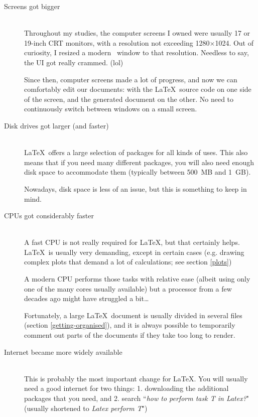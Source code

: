 \begin{description}
	\item[Screens got bigger] \mbox{} \\
	Throughout my studies, the computer screens I owned were usually 17 or 19-inch CRT monitors, with a resolution not exceeding 1280$\times$1024. Out of curiosity, I resized a modern \TeXstudio\ window to that resolution. Needless to say, the UI got really crammed. (lol)
	
	Since then, computer screens made a lot of progress, and now we can comfortably edit our documents: with the \LaTeX\ source code on one side of the screen, and the generated document on the other. No need to continuously switch between windows on a small screen.
	
	\item[Disk drives got larger (and faster)] \mbox{} \\
	\LaTeX\ offers a large selection of packages for all kinds of uses. This also means that if you need many different packages, you will also need enough disk space to accommodate them (typically between 500~MB and 1~GB).
	
	Nowadays, disk space is less of an issue, but this is something to keep in mind.
	
	\item[CPUs got considerably faster] \mbox{} \\
	A fast CPU is not really required for \LaTeX, but that certainly helps. \LaTeX\ is usually very demanding, except in certain cases (e.g. drawing complex plots that demand a lot of calculations; see section \ref{plots})
	
	A modern CPU performs those tasks with relative ease (albeit using only one of the many cores usually available) but a processor from a few decades ago might have struggled a bit\dots
	
	Fortunately, a large \LaTeX\ document is usually divided in several files (section \ref{getting-organised}), and it is always possible to temporarily comment out parts of the documents if they take too long to render.
	
	\item[Internet became more widely available] \mbox{} \\
	This is probably the most important change for \LaTeX. You will usually need a good internet for two things: 1. downloading the additional packages that you need, and 2. search ``\emph{how to perform task \emph{T} in Latex?}" (usually shortened to \emph{Latex perform T}")
	

\end{description}
